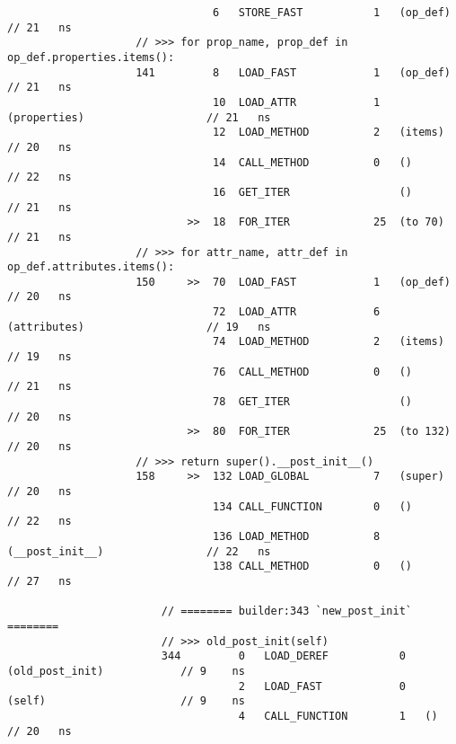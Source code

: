 \begin{code}
\begin{verbatim}
                                6   STORE_FAST           1   (op_def)                       // 21   ns
                    // >>> for prop_name, prop_def in op_def.properties.items():
                    141         8   LOAD_FAST            1   (op_def)                       // 21   ns
                                10  LOAD_ATTR            1   (properties)                   // 21   ns
                                12  LOAD_METHOD          2   (items)                        // 20   ns
                                14  CALL_METHOD          0   ()                             // 22   ns
                                16  GET_ITER                 ()                             // 21   ns
                            >>  18  FOR_ITER             25  (to 70)                        // 21   ns
                    // >>> for attr_name, attr_def in op_def.attributes.items():
                    150     >>  70  LOAD_FAST            1   (op_def)                       // 20   ns
                                72  LOAD_ATTR            6   (attributes)                   // 19   ns
                                74  LOAD_METHOD          2   (items)                        // 19   ns
                                76  CALL_METHOD          0   ()                             // 21   ns
                                78  GET_ITER                 ()                             // 20   ns
                            >>  80  FOR_ITER             25  (to 132)                       // 20   ns
                    // >>> return super().__post_init__()
                    158     >>  132 LOAD_GLOBAL          7   (super)                        // 20   ns
                                134 CALL_FUNCTION        0   ()                             // 22   ns
                                136 LOAD_METHOD          8   (__post_init__)                // 22   ns
                                138 CALL_METHOD          0   ()                             // 27   ns

                        // ======== builder:343 `new_post_init` ========
                        // >>> old_post_init(self)
                        344         0   LOAD_DEREF           0   (old_post_init)            // 9    ns
                                    2   LOAD_FAST            0   (self)                     // 9    ns
                                    4   CALL_FUNCTION        1   ()                         // 20   ns


\end{verbatim}
\end{code}
